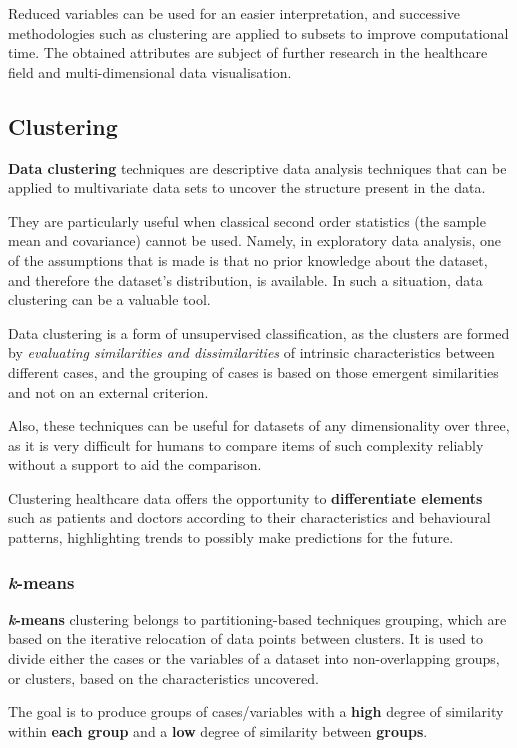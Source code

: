 Reduced variables can be used for an easier interpretation, and successive methodologies such as clustering are applied to subsets to improve computational time. The obtained attributes are subject of further research in the healthcare field and multi-dimensional data visualisation.

\subsection{Clustering}
\textbf{Data clustering} techniques are descriptive data analysis techniques that can be applied to multivariate data sets to uncover the structure present in the data. 

They are particularly useful when classical second order statistics (the sample mean and covariance) cannot be used. Namely, in exploratory data analysis, one of the assumptions that is made is that no prior knowledge about the dataset, and therefore the dataset’s distribution, is available. In such a situation, data clustering can be a valuable tool. 

Data clustering is a form of unsupervised classification, as the clusters are formed by \textit{evaluating similarities and dissimilarities} of intrinsic characteristics between different cases, and the grouping of cases is based on those emergent similarities and not on an external criterion. 

Also, these techniques can be useful for datasets of any dimensionality over three, as it is very difficult for humans to compare items of such complexity reliably without a support to aid the comparison\cite{kmeans}.

Clustering healthcare data offers the opportunity to \textbf{differentiate elements} such as patients and doctors according to their characteristics and behavioural patterns, highlighting trends to possibly make predictions for the future.

\subsubsection{\textit{k}-means}
\textbf{\textit{k}-means} clustering belongs to partitioning-based techniques grouping, which are based on the iterative relocation of data points between clusters. It is used to divide either the cases or the variables of a dataset into non-overlapping groups, or clusters, based on the characteristics uncovered\cite{kmeans}. 

The goal is to produce groups of cases/variables with a \textbf{high} degree of similarity within \textbf{each group} and a \textbf{low} degree of similarity between \textbf{groups}.


